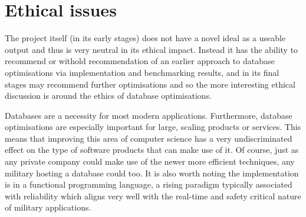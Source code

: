 \chapter{Ethical issues} %
\begin{comment}
What are the wider ethical, legal, professional and societal issues surrounding your project and the accompanying research? You should use the ethics checklist as the basis for this discussion. 
\end{comment}
The project itself (in its early stages) does not have a novel ideal as a useable output and thus is very neutral in its ethical impact. Instead it has the ability to recommend or withold recommendation of an earlier approach to database optimisations via implementation and benchmarking results, and in its final stages may recommend further optimisations and so the more interesting ethical discussion is around the ethics of database optimisations.


Databases are a necessity for most modern applications. Furthermore, database optimisations are especially important for large, scaling products or services. This means that improving this area of computer science has a very undiscriminated effect on the type of software products that can make use of it. Of course, just as any private company could make use of the newer more efficient techniques, any military hosting a database could too. It is also worth noting the implementation is in a functional programming language, a rising paradigm  typically associated with reliability   which aligns very well with the real-time and safety critical nature of military applications. 